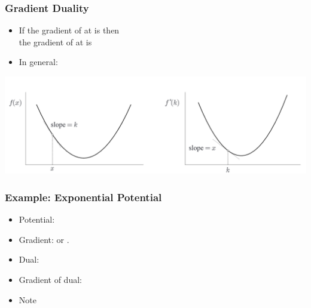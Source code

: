 \documentclass[handout]{beamer}
\begin{document}
\begin{small}
\begin{frame}
  \frametitle{Gradient Duality}
  \begin{itemize}
  \item
    If the gradient of  at  is  then\\
    the gradient of  at  is 
    \item In general:
  \end{itemize}
  \includegraphics[width=\textwidth]{figures/SlopeDuality.png}
\end{frame}

\begin{frame}
  \frametitle{Example: Exponential Potential}
  \begin{itemize}
  \item Potential: 
  \item Gradient:  or .
  \item Dual:  
  \item Gradient of dual:  
  \item Note 
   \end{itemize}
 \end{frame}


\end{small}
\end{document}
